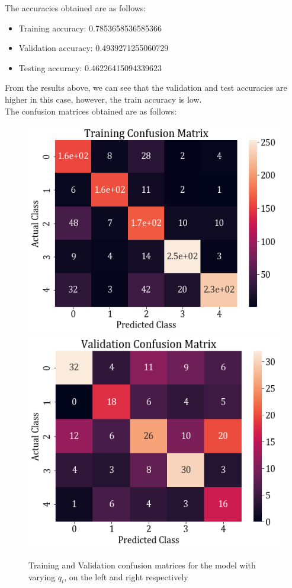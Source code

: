 \documentclass[11pt,a4paper]{article}
\newcommand{\noi}{\noindent}
\begin{document}
\noi
The accuracies obtained are as follows:
\begin{itemize}
    \itemsep0em
    \item Training accuracy: 0.7853658536585366
    \item Validation accuracy: 0.4939271255060729
    \item Testing accuracy: 0.46226415094339623
\end{itemize}

\noi
From the results above, we can see that the validation and test accuracies are higher in this case, however, the train accuracy is low.\\

\noi
The confusion matrices obtained are as follows:
\begin{figure}[H]
    \includegraphics[scale=0.5]{images/2a_full_cross_train.png}
    \includegraphics[scale=0.5]{images/2a_full_cross_val.png}
    \caption{Training and Validation confusion matrices for the model with varying $q_i$, on the left and right respectively}
\end{figure}
\end{document}
